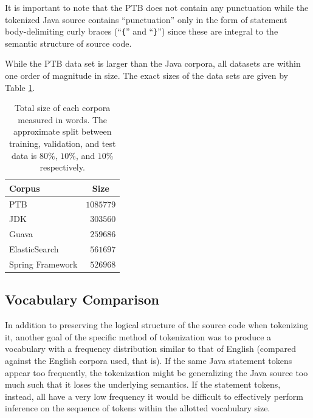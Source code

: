 \documentclass{article}
\begin{document}
It is important to note that the
PTB does not contain any punctuation while the tokenized
Java source contains ``punctuation'' only in the form of statement
body-delimiting curly braces (``\texttt\{'' and ``\texttt\}'')
since these are integral to the semantic structure of source code.


While the PTB data set is larger than the Java corpora, all datasets
are within one order of magnitude in size. The exact sizes of the
data sets are given by Table \ref{size-table}.

\begin{table}[t]
    \caption{Total size of each corpora measured in words. The approximate
    split between training, validation, and test data is $80\%$, $10\%$,
    and $10\%$ respectively.}
    \label{size-table}
    \vskip 0.15in
    \begin{center}
    \begin{tabular}{lr}
    \hline
    Corpus & \multicolumn{1}{c}{Size} \\
    \hline
    \abovespace
    PTB                 & $1085779$ \\
    JDK                 & $303560$ \\
    Guava               & $259686$ \\
    ElasticSearch       & $561697$ \\
    \belowspace
    Spring Framework    & $526968$ \\
    \hline
    \end{tabular}
    \end{center}
    \vskip -0.1in
\end{table}


\subsection{Vocabulary Comparison}

In addition to preserving the logical structure of the source code when
tokenizing it, another goal of the specific method of tokenization was to
produce a vocabulary with a frequency distribution similar to that of
English (compared against the English corpora used, that is). If the same
Java statement tokens appear too frequently, the tokenization might be
generalizing the Java source too much such that it loses the underlying
semantics. If the statement tokens, instead, all have a very low frequency
it would be difficult to effectively perform inference on the sequence of 
tokens within the allotted vocabulary size.
\end{document}
